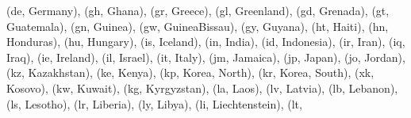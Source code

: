 \documentclass[letterpaper,10pt,english]{sphinxmanual}
\begin{document}
\begin{fulllineitems}
\begin{fulllineitems}
(\textquotesingle{}de\textquotesingle{}, \textquotesingle{}Germany\textquotesingle{}), (\textquotesingle{}gh\textquotesingle{}, \textquotesingle{}Ghana\textquotesingle{}), (\textquotesingle{}gr\textquotesingle{}, \textquotesingle{}Greece\textquotesingle{}), (\textquotesingle{}gl\textquotesingle{}, \textquotesingle{}Greenland\textquotesingle{}), (\textquotesingle{}gd\textquotesingle{}, \textquotesingle{}Grenada\textquotesingle{}), (\textquotesingle{}gt\textquotesingle{}, \textquotesingle{}Guatemala\textquotesingle{}), (\textquotesingle{}gn\textquotesingle{}, \textquotesingle{}Guinea\textquotesingle{}), (\textquotesingle{}gw\textquotesingle{}, \textquotesingle{}Guinea\sphinxhyphen{}Bissau\textquotesingle{}), (\textquotesingle{}gy\textquotesingle{}, \textquotesingle{}Guyana\textquotesingle{}), (\textquotesingle{}ht\textquotesingle{}, \textquotesingle{}Haiti\textquotesingle{}), (\textquotesingle{}hn\textquotesingle{}, \textquotesingle{}Honduras\textquotesingle{}), (\textquotesingle{}hu\textquotesingle{}, \textquotesingle{}Hungary\textquotesingle{}), (\textquotesingle{}is\textquotesingle{}, \textquotesingle{}Iceland\textquotesingle{}), (\textquotesingle{}in\textquotesingle{}, \textquotesingle{}India\textquotesingle{}), (\textquotesingle{}id\textquotesingle{}, \textquotesingle{}Indonesia\textquotesingle{}), (\textquotesingle{}ir\textquotesingle{}, \textquotesingle{}Iran\textquotesingle{}), (\textquotesingle{}iq\textquotesingle{}, \textquotesingle{}Iraq\textquotesingle{}), (\textquotesingle{}ie\textquotesingle{}, \textquotesingle{}Ireland\textquotesingle{}), (\textquotesingle{}il\textquotesingle{}, \textquotesingle{}Israel\textquotesingle{}), (\textquotesingle{}it\textquotesingle{}, \textquotesingle{}Italy\textquotesingle{}), (\textquotesingle{}jm\textquotesingle{}, \textquotesingle{}Jamaica\textquotesingle{}), (\textquotesingle{}jp\textquotesingle{}, \textquotesingle{}Japan\textquotesingle{}), (\textquotesingle{}jo\textquotesingle{}, \textquotesingle{}Jordan\textquotesingle{}), (\textquotesingle{}kz\textquotesingle{}, \textquotesingle{}Kazakhstan\textquotesingle{}), (\textquotesingle{}ke\textquotesingle{}, \textquotesingle{}Kenya\textquotesingle{}), (\textquotesingle{}kp\textquotesingle{}, \textquotesingle{}Korea, North\textquotesingle{}), (\textquotesingle{}kr\textquotesingle{}, \textquotesingle{}Korea, South\textquotesingle{}), (\textquotesingle{}xk\textquotesingle{}, \textquotesingle{}Kosovo\textquotesingle{}), (\textquotesingle{}kw\textquotesingle{}, \textquotesingle{}Kuwait\textquotesingle{}), (\textquotesingle{}kg\textquotesingle{}, \textquotesingle{}Kyrgyzstan\textquotesingle{}), (\textquotesingle{}la\textquotesingle{}, \textquotesingle{}Laos\textquotesingle{}), (\textquotesingle{}lv\textquotesingle{}, \textquotesingle{}Latvia\textquotesingle{}), (\textquotesingle{}lb\textquotesingle{}, \textquotesingle{}Lebanon\textquotesingle{}), (\textquotesingle{}ls\textquotesingle{}, \textquotesingle{}Lesotho\textquotesingle{}), (\textquotesingle{}lr\textquotesingle{}, \textquotesingle{}Liberia\textquotesingle{}), (\textquotesingle{}ly\textquotesingle{}, \textquotesingle{}Libya\textquotesingle{}), (\textquotesingle{}li\textquotesingle{}, \textquotesingle{}Liechtenstein\textquotesingle{}), (\textquotesingle{}lt\textquotesingle{}, 
\end{fulllineitems}
\end{fulllineitems}
\end{document}

